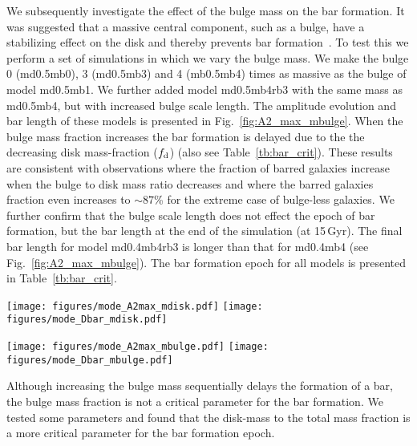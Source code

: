 We subsequently investigate the effect of the bulge mass on the bar formation. 
It was suggested that a massive central component, such as a bulge, have a
stabilizing effect 
on the disk and thereby prevents bar formation~\citep{2001ApJ...546..176S,2013MNRAS.434.1287S}.  
To test this we perform a set of simulations in which we vary the bulge mass.
We make the bulge 0 (md0.5mb0), 3 (md0.5mb3) and 4 (mb0.5mb4) times as massive 
as the bulge of model md0.5mb1. We further added model md0.5mb4rb3 with the same mass as md0.5mb4,
but with increased bulge scale length.
The amplitude evolution and bar length of these models is
presented in Fig.~\ref{fig:A2_max_mbulge}. 
When the bulge mass fraction increases the bar formation is delayed 
due to the the decreasing disk mass-fraction ($f_{\rm d}$)
(also see Table~\ref{tb:bar_crit}). 
These results are consistent with observations where the 
fraction of barred galaxies increase when the bulge to disk mass
ratio decreases and where the barred galaxies fraction even increases 
to $\sim 87$\% for the extreme case of bulge-less galaxies.
We further confirm that the bulge scale length does not effect the epoch of bar 
formation, but  the bar length at the end of the 
simulation (at 15\,Gyr). The final bar length for model md0.4mb4rb3 
is longer than that for md0.4mb4 (see Fig.~\ref{fig:A2_max_mbulge}). 
The bar formation epoch for all models is presented in Table~\ref{tb:bar_crit}.




\begin{figure*}
\texttt{[image: figures/mode\_A2max\_mdisk.pdf]}
\texttt{[image: figures/mode\_Dbar\_mdisk.pdf]}
\caption{
Time evolution of the maximum amplitude for $m=2$ (left)
and the bar length (right)
for models md0.1mb1, md0.3mb1, md0.4mb1, md0.5mb1, and md1mb1..
Black curves in the right panel indicate the bar length averaged over every
20 snapshots ($\sim 0.2$Gyr).
\label{fig:A2_max_mdisk}}
\end{figure*}




\begin{figure*}
\texttt{[image: figures/mode\_A2max\_mbulge.pdf]}
\texttt{[image: figures/mode\_Dbar\_mbulge.pdf]}
\caption{Same as Fig.~\ref{fig:A2_max_mdisk} but for models md0.5mb0,
md0.5mb1, md0.5mb3, md0.5mb4, and md0.5mb4rb3.
\label{fig:A2_max_mbulge}}
\end{figure*}

Although increasing the bulge mass sequentially delays the formation of a bar,
the bulge mass fraction is not a critical parameter for the bar formation. We tested
some parameters and found that the disk-mass to the total mass fraction is a more
critical parameter for the bar formation epoch.

